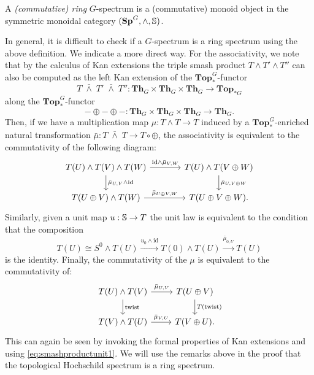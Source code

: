 \begin{mydef}
A \textit{(commutative) ring} $G$-spectrum is a (commutative) monoid object in
the symmetric monoidal category $(\mathbf{Sp}^G, \wedge, \mathbb{S})$.
\end{mydef}
In general, it is difficult to check if a $G$-spectrum is a ring spectrum using the above
definition. We indicate a more direct way. For the associativity, we note that
by the calculus of Kan extensions the triple smash product $T\wedge T'\wedge T''$
can also be computed as the left Kan extension of the $\mathbf{Top}_\ast^G$-functor
\[
T\;\bar{\wedge}\; T'\;\bar{\wedge}\; T'':\mathbf{Th}_G\times \mathbf{Th}_G\times \mathbf{Th}_G\to \mathbf{Top}_{\ast G}
\]
along the $\mathbf{Top}_\ast^G$-functor
\[
-\oplus-\oplus-: \mathbf{Th}_G\times \mathbf{Th}_G\times \mathbf{Th}_G\to \mathbf{Th}_G.
\]
Then, if we have a multiplication map $\mu:T\wedge T\to T$ induced by a $\mathbf{Top}_\ast^G$-enriched
natural transformation $\bar \mu:T\;\bar{\wedge}\; T\to T\circ \oplus$, the associativity
is equivalent to the commutativity of the following diagram:
\begin{equation}
\begin{tikzcd}[column sep = large]
T(U)\wedge T(V)\wedge T(W)
\arrow{d}{\bar \mu_{U,V}\wedge \mathrm{id}}\arrow{r}{\mathrm{id}\wedge \bar\mu_{V,W}}
&T(U)\wedge T(V\oplus W)
\arrow{d}{\bar\mu_{U,V\oplus W}}\\
T(U\oplus V)\wedge T(W)
\arrow{r}{\bar\mu_{U\oplus V,W}}
&T(U\oplus V\oplus W).
\end{tikzcd}
\end{equation}
Similarly, given a unit map $u: \mathbb{S}\to T$ the unit law is equivalent to the condition that the composition
\begin{equation}\label{eq:ringspectrumunit}
T(U)\cong S^0\wedge T(U)\xrightarrow{u_0\wedge\mathrm{id}} T(0)\wedge T(U)\xrightarrow{\bar\mu_{0,U}} T(U)
\end{equation}
is the identity. Finally, the commutativity of the $\mu$ is equivalent to the commutativity of:
\begin{equation}
\begin{tikzcd}
T(U)\wedge T(V)
\arrow{d}{\mathrm{twist}}\arrow{r}{\bar\mu_{U,V}}
&T(U\oplus V)
\arrow{d}{T(\mathrm{twist})}\\
T(V)\wedge T(U)
\arrow{r}{\bar\mu_{V,U}}
&T(V\oplus U).
\end{tikzcd}
\end{equation}
This can again be seen by invoking the formal properties
of Kan extensions and using \eqref{eq:smashproductunit1}. 
We will use the remarks above in the proof that the 
topological Hochschild spectrum is a ring spectrum.




